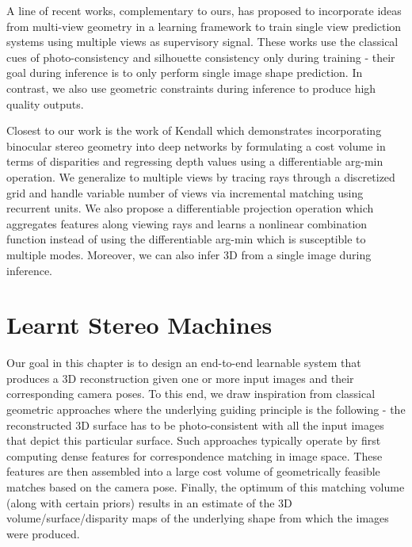 \documentclass[../thesis.tex]{subfiles}
\begin{document}
A line of recent works, complementary to ours, has proposed to incorporate ideas from multi-view geometry in a learning framework to train single view prediction systems \cite{garg2016unsupervised,yan2016perspective,tulsiani2017multi,rezende2016unsupervised,zhou2017unsupervised} using multiple views as supervisory signal. These works use the classical cues of photo-consistency and silhouette consistency only during training - their goal during inference is to only perform single image shape prediction. In contrast, we also use geometric constraints during inference to produce high quality outputs.

Closest to our work is the work of Kendall \etal \cite{kendall2017end} which demonstrates incorporating binocular stereo geometry into deep networks by formulating a cost volume in terms of disparities and regressing depth values using a differentiable arg-min operation. We generalize to multiple views by tracing rays through a discretized grid and handle variable number of views via incremental matching using recurrent units. We also propose a differentiable projection operation which aggregates features along viewing rays and learns a nonlinear combination function instead of using the differentiable arg-min which is susceptible to multiple modes. Moreover, we can also infer 3D from a single image during inference.



\section{Learnt Stereo Machines}
Our goal in this chapter is to design an end-to-end learnable system that produces a 3D reconstruction given one or more input images and their corresponding camera poses. To this end, we draw inspiration from classical geometric approaches where the underlying guiding principle is the following - the reconstructed 3D surface has to be photo-consistent with all the input images that depict this particular surface. Such approaches typically operate by first computing dense features for correspondence matching in image space. These features are then assembled into a large cost volume of geometrically feasible matches based on the camera pose. Finally, the optimum of this matching volume (along with certain priors) results in an estimate of the 3D volume/surface/disparity maps of the underlying shape from which the images were produced. 
\end{document}
